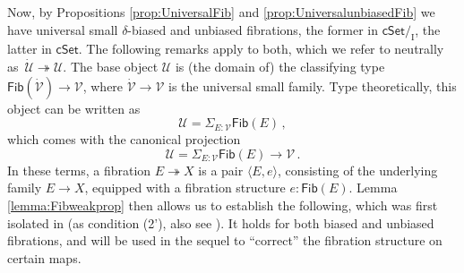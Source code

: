 \documentclass[11pt,reqno]{amsart}
\newcommand{\cSet}{\ensuremath{\mathsf{cSet}}}
\newcommand{\fib}{\ensuremath{\twoheadrightarrow}}
\renewcommand{\to}{\ensuremath{\rightarrow}}
\newcommand{\too}{\ensuremath{\longrightarrow}}
\newcommand{\I}{\ensuremath{\mathrm{I}}}
\newcommand{\U}{\ensuremath{\mathcal{U}}}
\newcommand{\UU}{\ensuremath{\,\dot{\mathcal{U}}}}
\newcommand{\V}{\ensuremath{\mathcal{V}}}
\newcommand{\VV}{\ensuremath{\dot{\mathcal{V}}}}
\newcommand{\Fib}{\ensuremath{\mathsf{Fib}}}
\theoremstyle{remark}
\theoremstyle{definition}
\begin{document}
Now, by Propositions \ref{prop:UniversalFib} and \ref{prop:UniversalunbiasedFib} we have universal small $\delta$-biased and unbiased fibrations, the former in $\cSet/_\I$, the latter in $\cSet$.  The following remarks apply to both, which we refer to neutrally as $\UU \fib \U$.  The base object $\U$ is (the domain of) the classifying type $\mathsf{Fib}(\VV) \to \V$, where $\VV \to \V$ is the universal small family.  Type theoretically, this object can be written as
\[
\U = \Sigma_{E:\V}\Fib(E)\,,
\] 
which comes with the canonical projection
\[
\U = \Sigma_{E:\V}\Fib(E) \too \V\,.
\] 
In these terms, a fibration $E \fib X$ is a pair $\langle E, e \rangle$, consisting of the underlying family $E\to X$, equipped with a fibration structure $e :\Fib(E)$.
%
\noindent Lemma \ref{lemma:Fibweakprop}  then allows us to establish the following, which was first isolated in \cite{Shu:15}  (as condition (2'), also see \cite{GSS:22}). It holds for both biased and unbiased fibrations, and will be used in the sequel to ``correct'' the fibration structure on certain maps.
\end{document}
